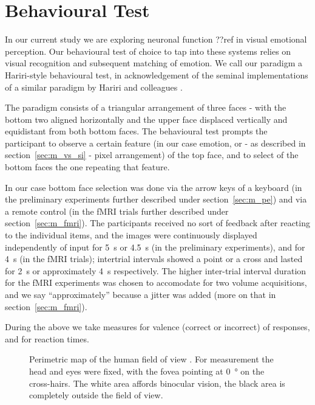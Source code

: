     \section{Behavioural Test}\label{sec:m_bt}
	In our current study we are exploring neuronal function ??ref in visual emotional perception.
	Our behavioural test of choice to tap into these systems relies on visual recognition and subsequent matching of emotion.
	We call our paradigm a Hariri-style behavioural test, in acknowledgement of the seminal implementations of a similar paradigm by Hariri and colleagues \cite{Hariri2000,Hariri2003}.
	    
	The paradigm consists of a triangular arrangement of three faces - with the bottom two aligned horizontally and the upper face displaced vertically and equidistant from both bottom faces.
	The behavioural test prompts the participant to observe a certain feature (in our case emotion, or - as described in section~\ref{sec:m_vs_si} - pixel arrangement) of the top face, and to select of the bottom faces the one repeating that feature.
	
	In our case bottom face selection was done via the arrow keys of a keyboard (in the preliminary experiments further described under section~\ref{sec:m_pe}) and via a remote control (in the fMRI trials further described under section~\ref{sec:m_fmri}).
	The participants received no sort of feedback after reacting to the individual items, and the images were continuously displayed independently of input for \SI{5}{\second} or \SI{4.5}{\second} (in the preliminary experiments), and for \SI{4}{\second} (in the fMRI trials); intertrial intervals showed a point or a cross and lasted for \SI{2}{\second} or approximately \SI{4}{\second} respectively.
	The higher inter-trial interval duration for the fMRI experiments was chosen to accomodate for two volume acquisitions, and we say “approximately” because a jitter was added (more on that in section~\ref{sec:m_fmri}). 
	
	During the above we take measures for valence (correct or incorrect) of responses, and for reaction times.
	
	\begin{wrapfigure}{r}{0.45\textwidth}
	  \centering
	    \caption{Perimetric map of the human field of view \cite{Ruch1960}.
	    For measurement the head and eyes were fixed, with the fovea pointing at \SI{0}{\degree} on the cross-hairs.
	    The white area affords binocular vision, the black area is completely outside the field of view.}
	    \label{fig:m_b_1}
	    \vspace{-1.0cm}
	\end{wrapfigure}
	
